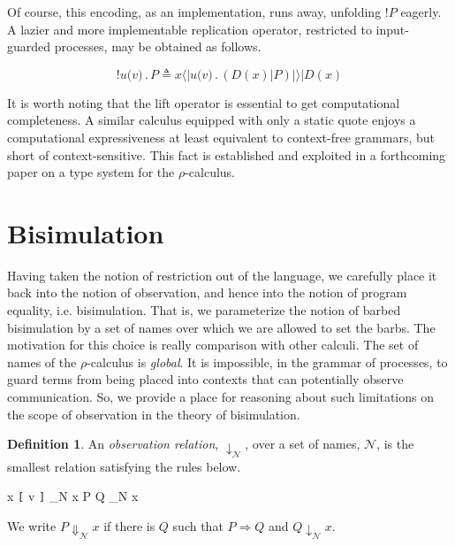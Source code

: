\documentclass[]{amsart}
\newcommand{\lliftb}{\langle\!|}
\newcommand{\rliftb}{|\!\rangle}
\newcommand{\id}[1]{\texttt{#1}}
\newcommand{\juxtap}{\mathbin{\id{|}}}
\newcommand{\concat}{\mathbin{.}}
\newcommand{\nameeq}{\mathbin{\equiv_N}}
\newcommand{\binpar}[2]{#1 \juxtap #2}
\newcommand{\outputp}[2]{#1 \id{[} #2 \id{]}}
\newcommand{\prefix}[3]{#1 \id{(} #2 \id{)} \concat #3}
\newcommand{\lift}[2]{#1 \lliftb #2 \rliftb}
\newcommand{\bangp}[1]{\id{!} #1}
\newcommand{\wred}{\Rightarrow}
\theoremstyle{definition}
\newtheorem{defn}[thm]{Definition}
\theoremstyle{remark}
\numberwithin{equation}{subsection}
\newcommand{\pic}{$\pi$-calculus}
\newcommand{\rhoc}{$\rho$-calculus}
\begin{document}
Of course, this encoding, as an implementation, runs away, unfolding
$\bangp{P}$ eagerly. A lazier and more implementable replication
operator, restricted to input-guarded processes, may be obtained as follows.

\begin{equation*}
\bangp{\prefix{u}{v}{P}} 
	\triangleq 
	\binpar{\lift{x}{\prefix{u}{v}{(\binpar{D(x)}{P})}}}{D(x)}
\end{equation*}

It is worth noting that the lift operator is essential to get
computational completeness. A similar calculus equipped with only a
static quote enjoys a computational expressiveness at least equivalent
to context-free grammars, but short of context-sensitive. This fact is
established and exploited in a forthcoming paper on a type system for
the {\rhoc}.

\section{Bisimulation}

Having taken the notion of restriction out of the language, we
carefully place it back into the notion of observation, and hence into
the notion of program equality, i.e. bisimulation. That is, we
parameterize the notion of barbed bisimulation by a set of names over
which we are allowed to set the barbs. The motivation for this choice
is really comparison with other calculi. The set of names of the
{\rhoc} is \textit{global}. It is impossible, in the grammar of
processes, to guard terms from being placed into contexts that can
potentially observe communication. So, we provide a place for
reasoning about such limitations on the scope of observation in the
theory of bisimulation.


\begin{defn}
An \emph{observation relation}, $\downarrow_{\mathcal N}$, over a set
of names, $\mathcal N$, is the smallest relation satisfying the rules
below.

\infrule[Out-barb]{y \in {\mathcal N}, \; x \nameeq y}
		  {\outputp{x}{v} \downarrow_{\mathcal N} x}
		  {\binpar{P}{Q} \downarrow_{\mathcal N} x}

We write $P \Downarrow_{\mathcal N} x$ if there is $Q$ such that 
$P \wred Q$ and $Q \downarrow_{\mathcal N} x$.
\end{defn}
\end{document}

